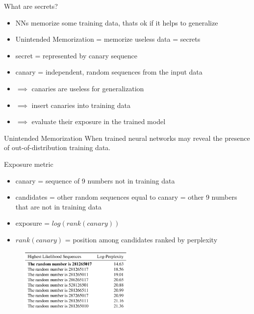 \documentclass{beamer}
\begin{document}
\begin{frame}{What are secrets?}

\begin{itemize}
\item NNs memorize some training data, thats ok if it helps to generalize
\item Unintended Memorization = memorize useless data = secrets
\item secret = represented by canary sequence
\item canary = independent, random sequences from the input data
\item $\implies$ canaries are useless for generalization 
\item $\implies$ insert canaries into training data
\item $\implies$ evaluate their exposure in the trained model
\end{itemize}

\vfill

\begin{block}{Unintended Memorization}
When trained neural networks may reveal the presence of out-of-distribution training data.
\end{block}

\end{frame}


\begin{frame}{Exposure metric}

\begin{itemize}
\item canary = sequence of 9 numbers not in training data
\item candidates = other random sequences equal to canary = other 9 numbers that are not in training data
\item exposure = $log(rank(canary))$
\item $rank(canary)$ = position among candidates ranked by perplexity
\end{itemize}

\begin{figure}[h]
\includegraphics[width=0.5\textwidth]{img/rank}
\end{figure}
\end{frame}
\end{document}

